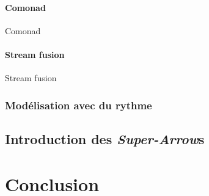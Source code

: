 \documentclass{llncs}
\newcommand{\SAs}{\emph{Super-Arrow}s }
\begin{document}
\begin{lstlisting}[language=haskell]
\end{lstlisting}

\paragraph{Comonad}
Comonad~\cite{Brookes91}~\cite{Coutts07}
\paragraph{Stream fusion}
Stream fusion~\cite{Yi05}

\subsubsection{Modélisation avec du rythme}

\subsection{Introduction des \SAs}

\section{Conclusion}

% 

% 



\end{document}
